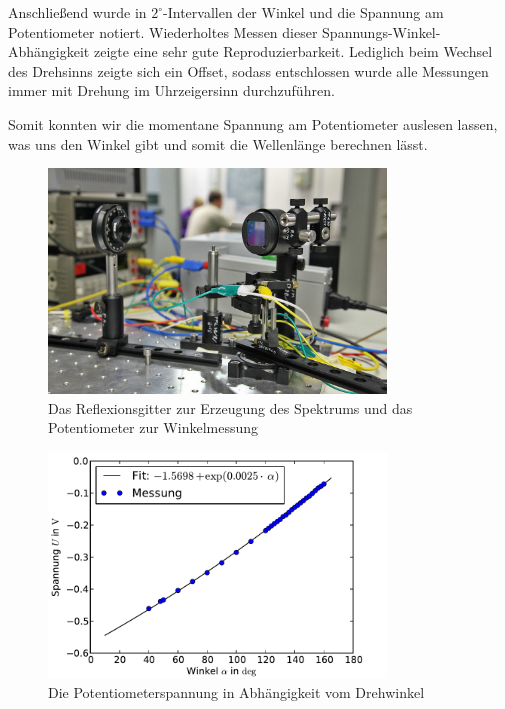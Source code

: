 \documentclass[11pt]{scrartcl}
\begin{document}
Anschließend wurde in $2^\circ$-Intervallen der Winkel und die Spannung am Potentiometer notiert. Wiederholtes Messen dieser Spannungs-Winkel-Abhängigkeit zeigte eine sehr gute Reproduzierbarkeit. Lediglich beim Wechsel des Drehsinns zeigte sich ein Offset, sodass entschlossen wurde alle Messungen immer mit Drehung im Uhrzeigersinn durchzuführen.

Somit konnten wir die momentane Spannung am Potentiometer auslesen lassen, was uns den Winkel gibt und somit die Wellenlänge berechnen lässt.

\begin{figure}[ht]
\begin{center}
\includegraphics[width=0.8\textwidth]{poti-reflexgitter.jpg}
\end{center}
\vspace{-1.5\baselineskip}
\caption{Das Reflexionsgitter zur Erzeugung des Spektrums und das Potentiometer zur Winkelmessung}
\label{fig:poti-reflexgitter}
\end{figure}

\begin{figure}[ht]
\begin{center}
\includegraphics[width=0.8\textwidth]{winkel_spannung.pdf}
\end{center}
\vspace{-1.5\baselineskip}
\caption{Die Potentiometerspannung in Abhängigkeit vom Drehwinkel}
\label{winkel_spannung}
\end{figure}
\end{document}
